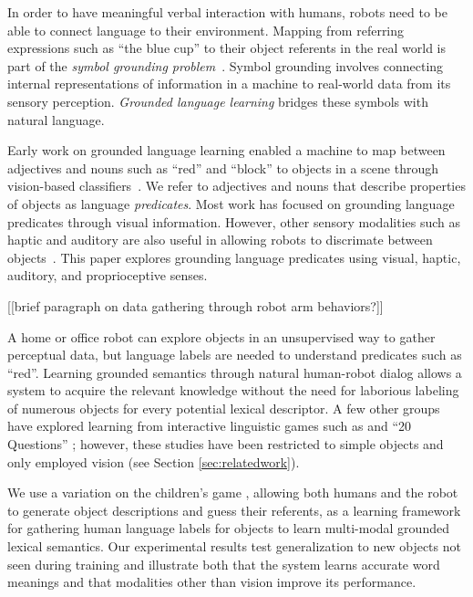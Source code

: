 In order to have meaningful verbal interaction with humans, robots need to be able to connect language to their environment.
Mapping from referring expressions such as ``the blue cup'' to their object referents in the real world is part of the \textit{symbol grounding problem}~\cite{harnad:phys90}.
Symbol grounding involves connecting internal representations of information in a machine to real-world data from its sensory perception.
\textit{Grounded language learning} bridges these symbols with natural language.

Early work on grounded language learning enabled a machine to map between adjectives and nouns such as ``red'' and ``block'' to objects in a scene through vision-based classifiers~\cite{roy:evocomm01}.
We refer to adjectives and nouns that describe properties of objects as language \textit{predicates}.
Most work has focused on grounding language predicates through visual information. However, other sensory modalities such as haptic and auditory are also useful in allowing robots to discrimate between objects~\cite{sinapov:icra14}.
This paper explores grounding language predicates using visual, haptic, auditory, and proprioceptive senses. 

[[brief paragraph on data gathering through robot arm behaviors?]]

A home or office robot can explore objects in an unsupervised way to gather perceptual data, but language labels are needed to understand predicates such as ``red''.
Learning grounded semantics through natural human-robot dialog allows a system to acquire the relevant knowledge without the need for laborious labeling of numerous objects for every potential lexical descriptor.
A few other groups have explored learning from interactive linguistic games such as \ispy and ``20 Questions'' \cite{parde:ijcai15,vogel:aaai10}; however, these studies have been restricted to simple objects and only employed vision (see Section \ref{sec:relatedwork}).

We use a variation on the children's game \ispy, allowing both humans and the robot to generate object descriptions and guess their referents, as a learning framework for gathering human language labels for objects to learn multi-modal grounded lexical semantics.
Our experimental results test generalization to new objects not seen during training and illustrate both that the system learns accurate word meanings and that modalities other than vision improve its performance.
